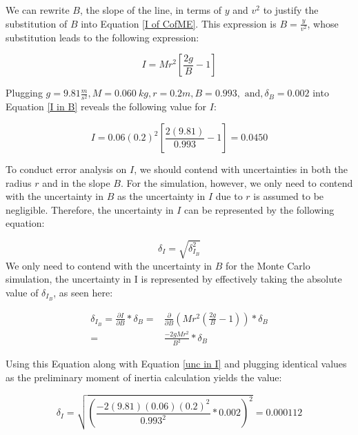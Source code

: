 \documentclass[12pt]{article}
\begin{document}
We can rewrite $B$, the slope of the line, in terms of $y$ and $v^2$ to justify the substitution of $B$ into Equation \ref{I of CofME}. This expression is $B=\frac{y}{v^2}$, whose substitution leads to the following expression:

\begin{equation}
    I=Mr^2[\frac{2g}{B}-1] \label{I in B}
\end{equation}

\noindent Plugging $g=9.81\frac{m}{s^2},M=0.060\ kg,r=0.2m, B = 0.993,\text{ and}, \delta_{B}=0.002$ into Equation \ref{I in B} reveals the following value for $I$:

\begin{equation*}
    I=0.06(0.2)^2[\frac{2(9.81)}{0.993}-1]=0.0450
\end{equation*}

\indent To conduct error analysis on $I$, we should contend with uncertainties in both the radius $r$ and in the slope $B$. For the simulation, however, we only need to contend with the uncertainty in $B$ as the uncertainty in $I$ due to $r$ is assumed to be negligible. Therefore, the uncertainty in $I$ can be represented by the following equation:

\begin{equation}
    \delta_I=\sqrt{\delta_{I_B}^2} \label{unc in I}
\end{equation}
\indent We only need to contend with the uncertainty in $B$ for the Monte Carlo simulation, the uncertainty in I is represented by effectively taking the absolute value of $\delta_{I_B}$, as seen here:

\begin{equation}
    \begin{split}
        \delta_{I_B}=\frac{\partial I}{\partial B} *\delta_{B}=&\frac{\partial}{\partial B}(Mr^2(\frac{2g}{B}-1))*\delta_{B}  \\
        =&\frac{-2gMr^2}{B^2}*\delta_{B} \label{dIB}
    \end{split}
\end{equation}

\noindent Using this Equation along with Equation \ref{unc in I} and plugging identical values as the preliminary moment of inertia calculation yields the value:\par

\begin{equation*}
    \delta_I =\sqrt{(\frac{-2(9.81)(0.06)(0.2)^2}{0.993^2}*0.002)^2}=0.000112
\end{equation*}
\end{document}
